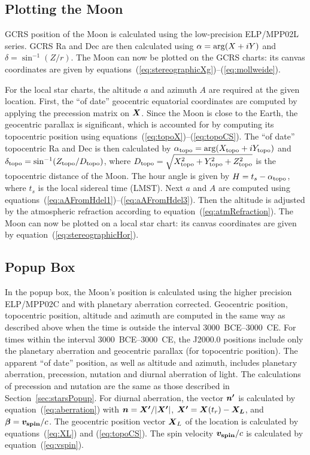 \documentclass[12pt]{article}
\newcommand{\ve}[1]{\mbox{\boldmath $#1$}}
\begin{document}
\subsection{Plotting the Moon} 

GCRS position of the Moon is calculated using the low-precision ELP/MPP02L 
series. GCRS Ra and Dec are then calculated using $\alpha={\rm arg}(X+iY)$ 
and $\delta=\sin^{-1}(Z/r)$. The Moon can now be plotted 
on the GCRS charts: its canvas coordinates are given by 
equations~(\ref{eq:stereographicXg})--(\ref{eq:mollweide}).

For the local star charts, the altitude $a$
and azimuth $A$ are required at the given location. First, the ``of date'' geocentric equatorial
coordinates are computed by applying the precession matrix on $\ve{X}$. 
Since the Moon is close to the Earth, the geocentric parallax is significant, which 
is accounted for by computing its topocentric position using 
equations~(\ref{eq:topoX})--(\ref{eq:topoCS}). The ``of date'' topocentric Ra and Dec
is then calculated by $\alpha_{\rm topo} = {\rm arg}(X_{\rm topo}+iY_{\rm topo})$ and 
$\delta_{\rm topo}=\sin^{-1} (Z_{\rm topo}/D_{\rm topo})$, where 
$D_{\rm topo}=\sqrt{X_{\rm topo}^2 + Y_{\rm topo}^2 + Z_{\rm topo}^2}$ is 
the topocentric distance of the Moon.
The hour angle is given by $H=t_s-\alpha_{\rm topo}$, where $t_s$ is the local
sidereal time (LMST). Next $a$ and $A$ are computed using
equations~(\ref{eq:aAFromHdel1})--(\ref{eq:aAFromHdel3}). Then the altitude
is adjusted by the atmospheric refraction according to equation~(\ref{eq:atmRefraction}).
The Moon can now be plotted on a local star chart: its canvas coordinates are
given by equation~(\ref{eq:stereographicHor}).

\subsection{Popup Box}

In the popup box, the Moon's position is calculated using the higher precision 
ELP/MPP02C and with planetary aberration corrected. Geocentric position, topocentric 
position, altitude and azimuth are computed in the same way as described above when 
the time is outside the interval 3000~BCE--3000~CE. For times within the interval 
3000~BCE--3000~CE, the J2000.0 positions
include only the planetary aberration and geocentric parallax (for topocentric
position). The apparent ``of date'' position, as well as altitude and azimuth,
includes planetary aberration, precession, nutation and diurnal aberration of light. 
The calculations of precession and nutation are the same
as those described in Section~\ref{sec:starsPopup}. For diurnal aberration, 
the vector $\ve{n'}$ is calculated by
equation~(\ref{eq:aberration}) with $\ve{n}=\ve{X'}/|\ve{X'}|$, 
$\ve{X'}=\ve{X}(t_r)-\ve{X_L}$, and $\ve{\beta}=\ve{v_{\rm spin}}/c$. 
The geocentric position vector $\ve{X}_L$ of the location is calculated by
equations~(\ref{eq:XL}) and (\ref{eq:topoCS}). The spin velocity 
$\ve{v_{\rm spin}}/c$ is calculated by equation~(\ref{eq:vspin}).
\end{document}
